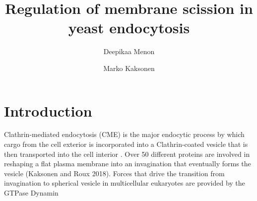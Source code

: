 \documentclass[9pt,lineno]{elife}
\title{Regulation of membrane scission in yeast endocytosis}
\author[1]{Deepikaa Menon}
\author[1*]{Marko Kaksonen}
\affil[1]{Department of Biochemistry, University of Geneva, Geneva, Switzerland}
\begin{document}
\maketitle

\begin{abstract}

\end{abstract}


\section{Introduction}

Clathrin-mediated endocytosis (CME) is the major endocytic process by which cargo from the cell exterior is incorporated into a Clathrin-coated vesicle that is then transported into the cell interior \citep{Bitsikas2014}. Over 50 different proteins are involved in reshaping a flat plasma membrane into an invagination that eventually forms the vesicle (Kaksonen and Roux 2018). Forces that drive the transition from invagination to spherical vesicle in multicellular eukaryotes are provided by the GTPase Dynamin 


\end{document}
